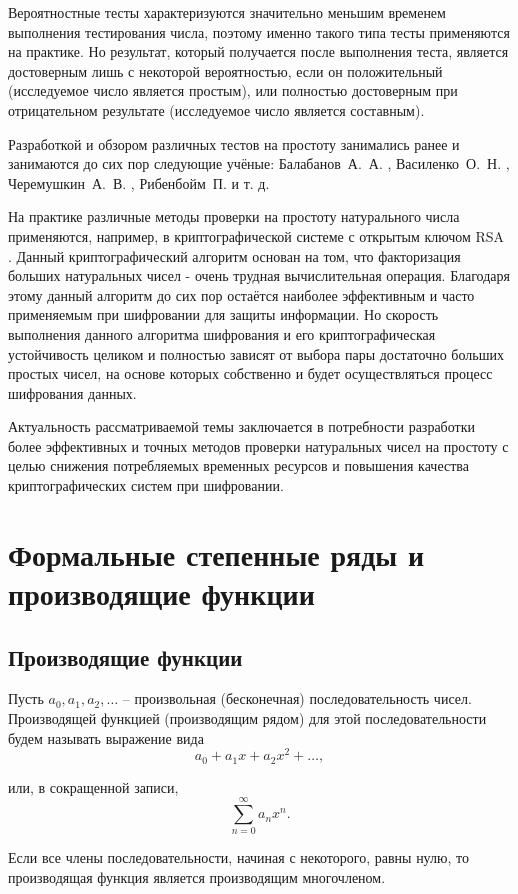 \documentclass[
russian,
cp1251,
14pt,
simple
]{eskdtext}
\theoremstyle{definition}
\begin{document}
Вероятностные тесты характеризуются значительно меньшим временем выполнения тестирования числа, поэтому именно такого типа тесты применяются на практике. Но результат, который получается    после выполнения теста, является достоверным лишь с некоторой вероятностью, если он положительный (исследуемое число является простым), или полностью достоверным при отрицательном результате (исследуемое число является составным). 

Разработкой и обзором различных тестов на простоту занимались ранее и занимаются до сих пор следующие учёные: Балабанов~А.~А. \cite{Balabanov}, Василенко~О.~Н. \cite{Vasilenko}, Черемушкин~А.~В. \cite{Cheremyshkin}, Рибенбойм~П. \cite{Ribenboim} и т. д.

На практике различные методы проверки на простоту натурального числа применяются, например, в криптографической системе с открытым ключом RSA \cite{RSA}. Данный криптографический алгоритм основан на том, что факторизация больших натуральных чисел - очень трудная вычислительная операция. Благодаря этому данный алгоритм до сих пор остаётся наиболее эффективным и часто применяемым при шифровании для защиты информации. Но скорость выполнения данного алгоритма шифрования и его криптографическая устойчивость целиком и полностью зависят от выбора пары достаточно больших простых чисел, на основе которых собственно и будет осуществляться процесс шифрования данных. 

Актуальность рассматриваемой темы заключается в потребности разработки более эффективных и точных методов проверки натуральных чисел на простоту с целью снижения потребляемых временных ресурсов и повышения качества криптографических систем при шифровании.

\newpage
\section{Формальные степенные ряды и производящие функции}
\subsection{Производящие функции}

Пусть $a_0, a_1, a_2, \ldots$ – произвольная (бесконечная) последовательность чисел. Производящей функцией (производящим рядом) для этой последовательности будем называть выражение вида
$$
a_0 + a_1 x + a_2 x^2 + \ldots,
$$

или, в сокращенной записи,
$$
\sum\limits_{n = 0}^\infty a_nx^n.
$$

Если все члены последовательности, начиная с некоторого, равны нулю, то производящая функция является производящим многочленом.
\end{document}
